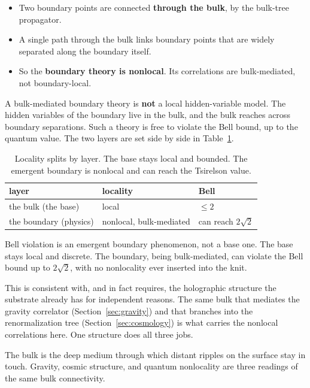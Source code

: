\begin{itemize}
\item Two boundary points are connected \textbf{through the bulk}, by the bulk-tree propagator.
\item A single path through the bulk links boundary points that are widely separated along the boundary itself.
\item So the \textbf{boundary theory is nonlocal}. Its correlations are bulk-mediated, not boundary-local.
\end{itemize}

A bulk-mediated boundary theory is \textbf{not} a local hidden-variable model. The hidden variables of the boundary live in the bulk, and the bulk reaches across boundary separations. Such a theory is free to violate the Bell bound, up to the quantum value. The two layers are set side by side in Table~\ref{tab:two-layers}.

\begin{table}[ht]
\centering
\begin{tabular}{@{}lll@{}}
\toprule
layer & locality & Bell \\
\midrule
the bulk (the base) & local & $\le 2$ \\
the boundary (physics) & nonlocal, bulk-mediated & can reach $2\sqrt{2}$ \\
\bottomrule
\end{tabular}
\caption{Locality splits by layer. The base stays local and bounded. The emergent boundary is nonlocal and can reach the Tsirelson value.}
\label{tab:two-layers}
\end{table}

\begin{result}
Bell violation is an emergent boundary phenomenon, not a base one. The base stays local and discrete. The boundary, being bulk-mediated, can violate the Bell bound up to $2\sqrt{2}$, with no nonlocality ever inserted into the knit.
\end{result}

This is consistent with, and in fact requires, the holographic structure the substrate already has for independent reasons. The same bulk that mediates the gravity correlator (Section~\ref{sec:gravity}) and that branches into the renormalization tree (Section~\ref{sec:cosmology}) is what carries the nonlocal correlations here. One structure does all three jobs.

\begin{principle}
The bulk is the deep medium through which distant ripples on the surface stay in touch. Gravity, cosmic structure, and quantum nonlocality are three readings of the same bulk connectivity.
\end{principle}

